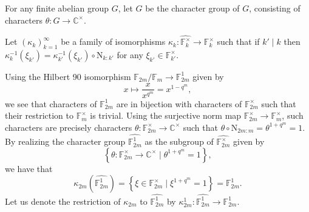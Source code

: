 \documentclass[12pt, reqno]{amsart}
\theoremstyle{definition}
\theoremstyle{definition}
\theoremstyle{definition}
\newcommand{\cComplex}{\mathbb{C}}
\newcommand{\multiplicativegroup}[1]{#1^{\times}}
\newcommand{\FieldNorm}[2]{\mathrm{N}_{#1:#2}}
\newcommand{\finiteField}{\mathbb{F}}
\newcommand{\finiteFieldExtension}[1]{\finiteField_{#1}}
\newcommand{\charactergroup}[1]{\widehat{\multiplicativegroup{\finiteFieldExtension{#1}}}}
\newcommand{\ToriDualToriIsomorphism}{\kappa}
\begin{document}
For any finite abelian group $G$, let $\widehat{G}$ be the character group of $G$, consisting of characters $\theta \colon G \to \multiplicativegroup{\cComplex}$.

Let $\left(\ToriDualToriIsomorphism_k\right)_{k=1}^{\infty}$ be a family of isomorphisms $\ToriDualToriIsomorphism_k \colon \charactergroup{k} \to \multiplicativegroup{\finiteFieldExtension{k}}$ such that if $k' \mid k$ then $\ToriDualToriIsomorphism_k^{-1}\left(\xi_{k'}\right) = \ToriDualToriIsomorphism_{k'}^{-1}\left(\xi_{k'}\right) \circ \FieldNorm{k}{k'}$ for any $\xi_{k'} \in \multiplicativegroup{\finiteFieldExtension{k'}}$.

Using the Hilbert 90 isomorphism $\finiteFieldExtension{2m} \slash \finiteFieldExtension{m} \to \finiteFieldExtension{2m}^{1}$ given by $$x \mapsto \frac{x}{x^{q^m}} = x^{1 - q^m},$$ we see that characters of $\finiteFieldExtension{2m}^1$ are in bijection with characters of $\multiplicativegroup{\finiteFieldExtension{2m}}$ such that their restriction to $\multiplicativegroup{\finiteFieldExtension{m}}$ is trivial. Using the surjective norm map $\multiplicativegroup{\finiteFieldExtension{2m}} \to \multiplicativegroup{\finiteFieldExtension{m}}$, such characters are precisely characters $\theta \colon \multiplicativegroup{\finiteFieldExtension{2m}} \to \multiplicativegroup{\cComplex}$ such that $\theta \circ \FieldNorm{2m}{m} = \theta^{1 + q^m} = 1$. By realizing the character group $\widehat{\finiteFieldExtension{2m}^1}$ as the subgroup of $\charactergroup{2m}$ given by $$\left\{ \theta \colon \multiplicativegroup{\finiteFieldExtension{2m}} \to \multiplicativegroup{\cComplex} \mid \theta^{1+q^m} = 1\right\},$$
we have that $$\ToriDualToriIsomorphism_{2m}\left(\widehat{\finiteFieldExtension{2m}^1}\right) = \left\{\xi \in \multiplicativegroup{\finiteFieldExtension{2m}} \mid \xi^{1+q^m} = 1\right\} = \finiteFieldExtension{2m}^1.$$
Let us denote the restriction of $\ToriDualToriIsomorphism_{2m}$ to $\widehat{\finiteFieldExtension{2m}^1}$ by $\ToriDualToriIsomorphism_{2m}^1 \colon \widehat{\finiteFieldExtension{2m}^1} \to \finiteFieldExtension{2m}^1$.
\end{document}
